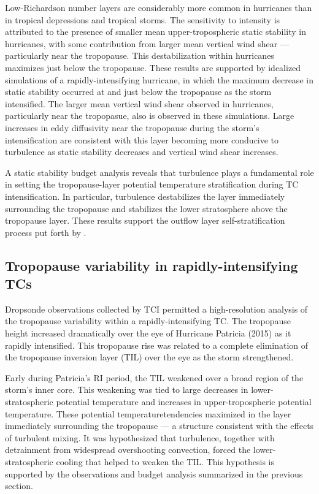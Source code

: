 Low-Richardson number layers are considerably more common in hurricanes than in tropical depressions and tropical storms.
The sensitivity to intensity is attributed to the presence of smaller mean upper-tropospheric static stability in hurricanes, with some contribution from larger mean vertical wind shear --- particularly near the tropopause.
This destabilization within hurricanes maximizes just below the tropopause.
These results are supported by idealized simulations of a rapidly-intensifying hurricane, in which the maximum decrease in static stability occurred at and just below the tropopause as the storm intensified.
The larger mean vertical wind shear observed in hurricanes, particularly near the tropopasue, also is observed in these simulations.
Large increases in eddy diffusivity near the tropopause during the storm's intensification are consistent with this layer becoming more conducive to turbulence as static stability decreases and vertical wind shear increases.

A static stability budget analysis reveals that turbulence plays a fundamental role in setting the tropopause-layer potential temperature stratification during TC intensification.
In particular, turbulence destabilizes the layer immediately surrounding the tropopause and stabilizes the lower stratosphere above the tropopause layer.
These results support the outflow layer self-stratification process put forth by \cite{EmanuelRotunno2011}.

\subsection{Tropopause variability in rapidly-intensifying TCs}

Dropsonde observations collected by TCI permitted a high-resolution analysis of the tropopause variability within a rapidly-intensifying TC.
The tropopause height increased dramatically over the eye of Hurricane Patricia (2015) as it rapidly intensified.
This tropopause rise was related to a complete elimination of the tropopause inversion layer (TIL) over the eye as the storm strengthened.

Early during Patricia's RI period, the TIL weakened over a broad region of the storm's inner core.
This weakening was tied to large decreases in lower-stratospheric potential temperature and increases in upper-tropospheric potential temperature.
These potential temperaturetendencies maximized in the layer immediately surrounding the tropopause --- a structure consistent with the effects of turbulent mixing.
It was hypothesized that turbulence, together with detrainment from widespread overshooting convection, forced the lower-stratospheric cooling that helped to weaken the TIL.
This hypothesis is supported by the observations and budget analysis summarized in the previous section.

